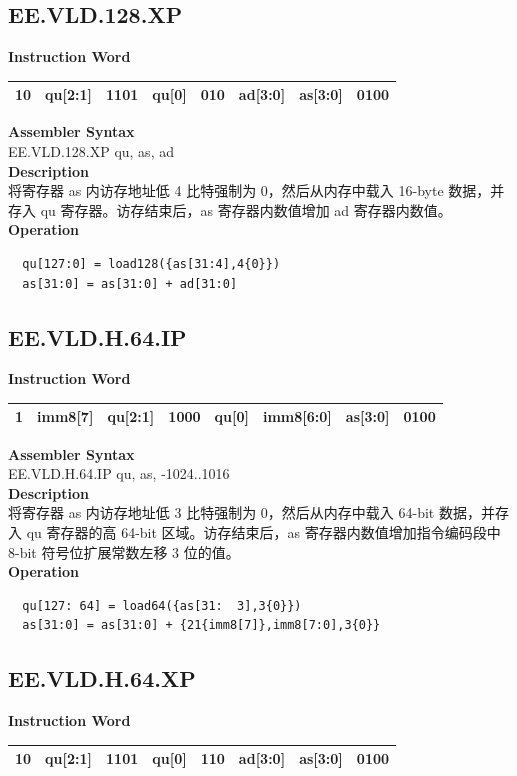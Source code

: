 \clearpage
\subsection{EE.VLD.128.XP}\label{instruction:EEVLD128XP}
\setlength\tabcolsep{6pt}
\textbf{Instruction Word} \\
\begin{tabular}{|c|c|c|c|c|c|c|c|}
	\hline
	10 & qu[2:1] & 1101 & qu[0] & 010 & ad[3:0] & as[3:0] & 0100 \\
	\hline
\end{tabular}

\textbf{Assembler Syntax} \\
EE.VLD.128.XP qu, as, ad \\
\textbf{Description} \\
将寄存器 as 内访存地址低 4 比特强制为 0，然后从内存中载入 16-byte 数据，并存入 qu 寄存器。访存结束后，as 寄存器内数值增加 ad 寄存器内数值。\\
\textbf{Operation}
\begin{lstlisting}
  qu[127:0] = load128({as[31:4],4{0}})
  as[31:0] = as[31:0] + ad[31:0]
\end{lstlisting}

\clearpage
\subsection{EE.VLD.H.64.IP}\label{instruction:EEVLDH64IP}
\setlength\tabcolsep{6pt}
\textbf{Instruction Word} \\
\begin{tabular}{|c|c|c|c|c|c|c|c|}
	\hline
	1 & imm8[7] & qu[2:1] & 1000 & qu[0] & imm8[6:0] & as[3:0] & 0100 \\
	\hline
\end{tabular}

\textbf{Assembler Syntax} \\
EE.VLD.H.64.IP qu, as, -1024..1016 \\
\textbf{Description} \\
将寄存器 as 内访存地址低 3 比特强制为 0，然后从内存中载入 64-bit 数据，并存入 qu 寄存器的高 64-bit 区域。访存结束后，as 寄存器内数值增加指令编码段中 8-bit 符号位扩展常数左移 3 位的值。\\
\textbf{Operation}
\begin{lstlisting}
  qu[127: 64] = load64({as[31:  3],3{0}})
  as[31:0] = as[31:0] + {21{imm8[7]},imm8[7:0],3{0}}
\end{lstlisting}

\clearpage
\subsection{EE.VLD.H.64.XP}\label{instruction:EEVLDH64XP}
\setlength\tabcolsep{6pt}
\textbf{Instruction Word} \\
\begin{tabular}{|c|c|c|c|c|c|c|c|}
	\hline
	10 & qu[2:1] & 1101 & qu[0] & 110 & ad[3:0] & as[3:0] & 0100 \\
	\hline
\end{tabular}

